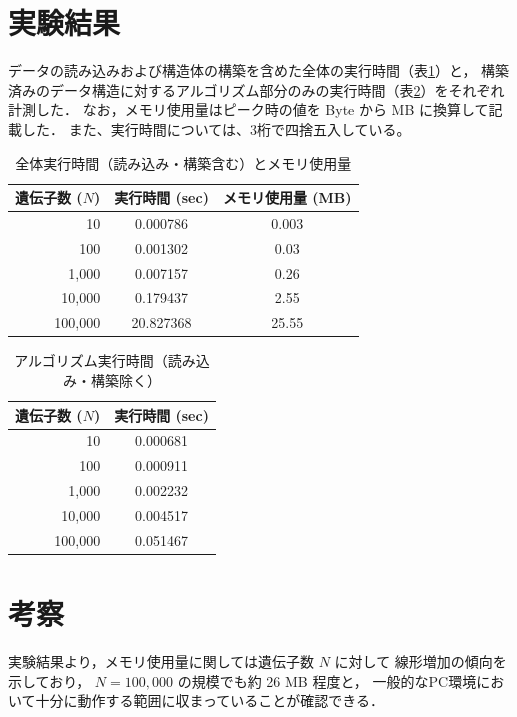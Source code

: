 \documentclass[paper=a4,fontsize=11pt,report,oneside]{jlreq}
\begin{document}
\section{実験結果}
データの読み込みおよび構造体の構築を含めた全体の実行時間（表\ref{tab:benchmark_total}）と，
構築済みのデータ構造に対するアルゴリズム部分のみの実行時間（表\ref{tab:benchmark_algo}）をそれぞれ計測した．
なお，メモリ使用量はピーク時の値を Byte から MB に換算して記載した．
また、実行時間については、3桁で四捨五入している。

\begin{table}[H]
    \centering
    \caption{全体実行時間（読み込み・構築含む）とメモリ使用量}
    \label{tab:benchmark_total}
    \begin{tabular}{rcc}
        \hline
        遺伝子数 ($N$) & 実行時間 (sec) & メモリ使用量 (MB) \\
        \hline
        10      & 0.000786 & 0.003 \\
        100     & 0.001302 & 0.03 \\
        1,000   & 0.007157 & 0.26 \\
        10,000  & 0.179437 & 2.55 \\
        100,000 & 20.827368 & 25.55 \\
        \hline
    \end{tabular}
\end{table}

\begin{table}[H]
    \centering
    \caption{アルゴリズム実行時間（読み込み・構築除く）}
    \label{tab:benchmark_algo}
    \begin{tabular}{rc}
        \hline
        遺伝子数 ($N$) & 実行時間 (sec) \\
        \hline
        10      & 0.000681 \\
        100     & 0.000911 \\
        1,000   & 0.002232 \\
        10,000  & 0.004517 \\
        100,000 & 0.051467 \\
        \hline
    \end{tabular}
\end{table}

\section{考察}
実験結果より，メモリ使用量に関しては遺伝子数 $N$ に対して
線形増加の傾向を示しており，
$N=100,000$ の規模でも約 26 MB 程度と，
一般的なPC環境において十分に動作する範囲に収まっていることが確認できる．
\end{document}
